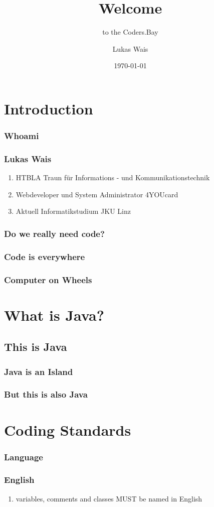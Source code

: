 \documentclass[aspectratio=169]{beamer}
\title{Welcome}
\subtitle{to the Coders.Bay}
\author{Lukas Wais}
\date{\today}
\begin{document}
\frame{\titlepage}
\frame{\tableofcontents}
\section{Introduction}
\subsubsection{Whoami}
\begin{frame}
  \frametitle{Lukas Wais}
  \begin{enumerate}
    \item HTBLA Traun für Informations - und Kommunikationstechnik
    \item Webdeveloper und System Administrator 4YOUcard
    \item Aktuell Informatikstudium JKU Linz
  \end{enumerate}
\end{frame}

\subsubsection{Do we really need code?}
\begin{frame}
  \frametitle{Code is everywhere}
\end{frame}

\begin{frame}
  \frametitle{Computer on Wheels}
\end{frame}

\section{What is Java?}
\subsection{This is Java}
\begin{frame}
  \frametitle{Java is an Island}
\end{frame}

\begin{frame}
  \frametitle{But this is also Java}
\end{frame}
\section{Coding Standards}
\subsubsection{Language}
\begin{frame}
  \frametitle{English}

  \begin{enumerate}
    \item variables, comments and classes MUST be named in English
  \end{enumerate}
\end{frame}
\end{document}
